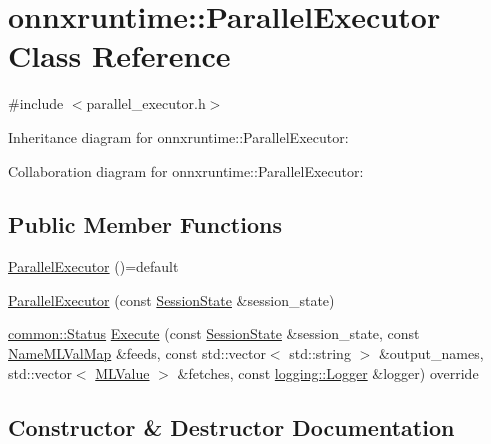 \hypertarget{classonnxruntime_1_1ParallelExecutor}{}\section{onnxruntime\+:\+:Parallel\+Executor Class Reference}
\label{classonnxruntime_1_1ParallelExecutor}


{\ttfamily \#include $<$parallel\+\_\+executor.\+h$>$}



Inheritance diagram for onnxruntime\+:\+:Parallel\+Executor\+:


Collaboration diagram for onnxruntime\+:\+:Parallel\+Executor\+:
\subsection*{Public Member Functions}
\begin{DoxyCompactItemize}
\item 
\mbox{\hyperlink{classonnxruntime_1_1ParallelExecutor_a77317228301717613ec5e8ae8ad2b2e9}{Parallel\+Executor}} ()=default
\item 
\mbox{\hyperlink{classonnxruntime_1_1ParallelExecutor_a2f6a73c8852a30badec14742d6092d0d}{Parallel\+Executor}} (const \mbox{\hyperlink{classonnxruntime_1_1SessionState}{Session\+State}} \&session\+\_\+state)
\item 
\mbox{\hyperlink{classonnxruntime_1_1common_1_1Status}{common\+::\+Status}} \mbox{\hyperlink{classonnxruntime_1_1ParallelExecutor_acdbf9253a5e240edb49737571d321c63}{Execute}} (const \mbox{\hyperlink{classonnxruntime_1_1SessionState}{Session\+State}} \&session\+\_\+state, const \mbox{\hyperlink{namespaceonnxruntime_a48b01f0410ec8d693dbd40d1132bd66c}{Name\+M\+L\+Val\+Map}} \&feeds, const std\+::vector$<$ std\+::string $>$ \&output\+\_\+names, std\+::vector$<$ \mbox{\hyperlink{classonnxruntime_1_1MLValue}{M\+L\+Value}} $>$ \&fetches, const \mbox{\hyperlink{classonnxruntime_1_1logging_1_1Logger}{logging\+::\+Logger}} \&logger) override
\end{DoxyCompactItemize}


\subsection{Constructor \& Destructor Documentation}
\mbox{\label{classonnxruntime_1_1ParallelExecutor_a77317228301717613ec5e8ae8ad2b2e9}} 
